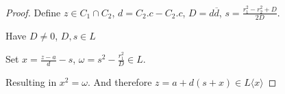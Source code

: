 \begin{proof}
    \leanok
    Define 
    $z \in C_1 \cap C_2$,
    $d=C_2.c-C_2.c$,
    $D=d\overline d$,
    $s=\frac{r_1^2-r_2^2+D}{2D}$.
   
    Have $D\ne0$, $D,s\in L$

    Set
    $x=\frac{z-a}{d}-s$,
    $\omega=s^2-\frac{r_1^2}{D}\in L$.

    Resulting in $x^2=\omega$. And therefore $z=a+d(s+x)\in L\langle x\rangle$

\end{proof}

